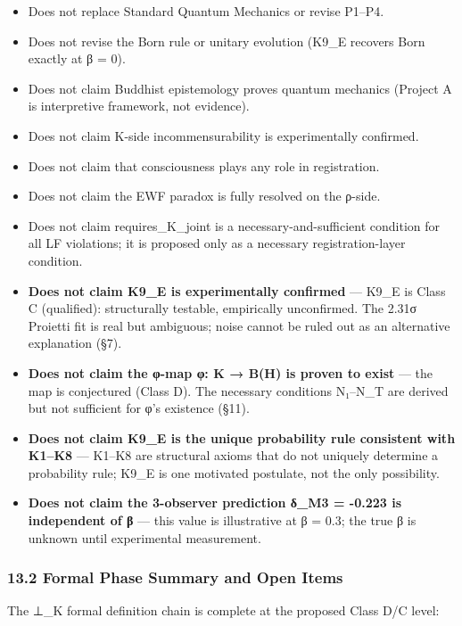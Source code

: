 \documentclass[
  11pt,
]{article}
\providecommand{\tightlist}{%
  \setlength{\itemsep}{0pt}\setlength{\parskip}{0pt}}
\begin{document}
\begin{itemize}
\tightlist
\item
  Does not replace Standard Quantum Mechanics or revise P1--P4.
\item
  Does not revise the Born rule or unitary evolution (K9\_E recovers
  Born exactly at β = 0).
\item
  Does not claim Buddhist epistemology proves quantum mechanics (Project
  A is interpretive framework, not evidence).
\item
  Does not claim K-side incommensurability is experimentally confirmed.
\item
  Does not claim that consciousness plays any role in registration.
\item
  Does not claim the EWF paradox is fully resolved on the ρ-side.
\item
  Does not claim requires\_K\_joint is a necessary-and-sufficient
  condition for all LF violations; it is proposed only as a necessary
  registration-layer condition.
\item
  \textbf{Does not claim K9\_E is experimentally confirmed} --- K9\_E is
  Class C (qualified): structurally testable, empirically unconfirmed.
  The 2.31σ Proietti fit is real but ambiguous; noise cannot be ruled
  out as an alternative explanation (§7).
\item
  \textbf{Does not claim the φ-map φ: K → B(H) is proven to exist} ---
  the map is conjectured (Class D). The necessary conditions N₁--N\_T
  are derived but not sufficient for φ's existence (§11).
\item
  \textbf{Does not claim K9\_E is the unique probability rule consistent
  with K1--K8} --- K1--K8 are structural axioms that do not uniquely
  determine a probability rule; K9\_E is one motivated postulate, not
  the only possibility.
\item
  \textbf{Does not claim the 3-observer prediction δ\_M3 = -0.223 is
  independent of β} --- this value is illustrative at β = 0.3; the true
  β is unknown until experimental measurement.
\end{itemize}

\subsubsection{13.2 Formal Phase Summary and Open
Items}\label{formal-phase-summary-and-open-items}

The ⊥\_K formal definition chain is complete at the proposed Class D/C
level:
\end{document}
